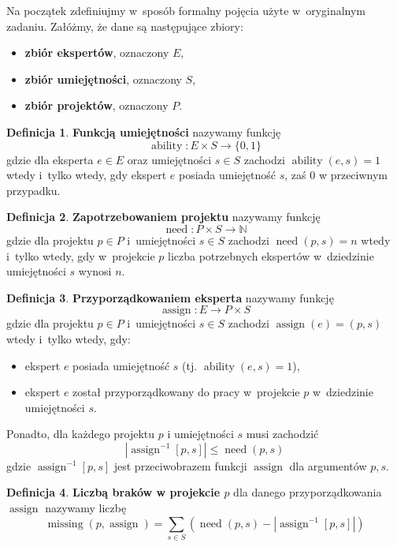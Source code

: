 \documentclass[12pt,a4paper]{article}
\theoremstyle{definition}
\newtheorem{defn}{Definicja}
\DeclareMathOperator{\ability}{ability}
\DeclareMathOperator{\need}{need}
\DeclareMathOperator{\assign}{assign}
\DeclareMathOperator{\missing}{missing}
\begin{document}
\noindent
Na początek zdefiniujmy w~sposób formalny pojęcia użyte w~oryginalnym zadaniu.
Załóżmy, że dane są następujące zbiory:

\begin{itemize}
	\item \textbf{zbiór ekspertów}, oznaczony $E$,
	\item \textbf{zbiór umiejętności}, oznaczony $S$,
	\item \textbf{zbiór projektów}, oznaczony $P$.
\end{itemize}

\begin{defn}
\textbf{Funkcją umiejętności} nazywamy funkcję
$$ \ability : E \times S \to \{ 0,1 \} $$
gdzie dla eksperta $e \in E$ oraz umiejętności $s \in S$ zachodzi
$\ability(e, s) = 1$ wtedy i~tylko wtedy, gdy ekspert $e$ posiada umiejętność
$s$, zaś 0 w przeciwnym przypadku.
\end{defn}

\begin{defn}
\textbf{Zapotrzebowaniem projektu} nazywamy funkcję
$$ \need : P \times S \to \mathbb{N} $$
gdzie dla projektu $p \in P$ i~umiejętności $s \in S$ zachodzi $\need(p, s) = n$
wtedy i~tylko wtedy, gdy w~projekcie $p$ liczba potrzebnych ekspertów
w~dziedzinie umiejętności $s$ wynosi $n$.
\end{defn}

\begin{defn}
\textbf{Przyporządkowaniem eksperta} nazywamy funkcję
$$ \assign : E \to P \times S $$
gdzie dla projektu $p \in P$ i~umiejętności $s \in S$ zachodzi
$\assign(e) = (p,s)$ wtedy i~tylko wtedy, gdy:
\begin{itemize}
	\item ekspert $e$ posiada umiejętność $s$ (tj. $\ability(e,s) = 1$),
	\item ekspert $e$ został przyporządkowany do pracy w~projekcie $p$
	w~dziedzinie umiejętności $s$.
\end{itemize}
Ponadto, dla każdego projektu $p$ i umiejętności $s$ musi zachodzić
$$ \left| \assign^{-1}[p,s] \right| \leq \need(p,s) $$
gdzie $\assign^{-1}[p,s]$ jest przeciwobrazem funkcji $\assign$ dla argumentów
$p,s$.
\end{defn}

\begin{defn}
\label{defn:missing}
\textbf{Liczbą braków w projekcie $p$} dla danego przyporządkowania $\assign$
nazywamy liczbę
$$ \missing(p,\assign) = \sum_{s \in S} \left( \need(p,s) -
\left| \assign^{-1}[p,s] \right| \right) $$
\end{defn}
\end{document}
